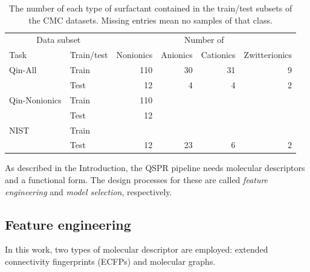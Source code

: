 \begin{table}
    \centering
    \caption{The number of each type of surfactant contained in the train/test subsets of the CMC datasets. Missing entries mean no samples of that class.}
    \label{tab:data-split}
    \begin{tabular}{@{}llrrrr@{}} \toprule \multicolumn{2}{c}{Data subset} & \multicolumn{4}{c}{Number of}                                                    \\\cmidrule(r){1-2}\cmidrule(l){3-6}
               Task                                                    & Train/test                    & Nonionics & Anionics & Cationics & Zwitterionics \\\midrule
               Qin-All                                                 & Train                         & 110       & 30       & 31        & 9             \\
                                                                       & Test                          & 12        & 4        & 4         & 2             \\
               Qin-Nonionics                                           & Train                         & 110       &          &           &               \\
                                                                       & Test                          & 12        &          &           &               \\
               NIST                                                    & Train                         &           &          &           &               \\
                                                                       & Test                          & 12        & 23       & 6         & 2             \\\bottomrule
    \end{tabular}
\end{table}

As described in the Introduction, the QSPR pipeline needs molecular descriptors
and a functional form. The design processes for these are called \emph{feature
    engineering} and \emph{model selection}, respectively.

\subsection{Feature engineering}

In this work, two types of molecular descriptor are employed: extended
connectivity fingerprints (ECFPs)
\cite{rogersExtendedConnectivityFingerprints2010} and molecular graphs.

